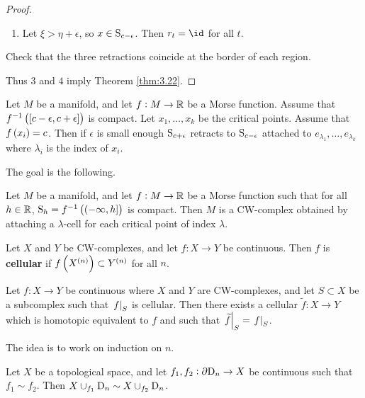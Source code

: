 \begin{proof}
\begin{enumerate}
\begin{enumerate}[label=Case \arabic*., leftmargin=0.5in]
\item Let $ \xi > \eta + \epsilon $, so $ x \in \S_{c - \epsilon} $. Then $ r_t = \id $ for all $ t $.
\end{enumerate}
Check that the three retractions coincide at the border of each region.
\end{enumerate}
Thus $ 3 $ and $ 4 $ imply Theorem \ref{thm:3.22}.
\end{proof}

\begin{remark}
Let $ M $ be a manifold, and let $ f : M \to \RR $ be a Morse function. Assume that $ f^{-1}\br{\sbr{c - \epsilon, c + \epsilon}} $ is compact. Let $ x_1, \dots, x_k $ be the critical points. Assume that $ f\br{x_i} = c $. Then if $ \epsilon $ is small enough $ \S_{c + \epsilon} $ retracts to $ \S_{c - \epsilon} $ attached to $ e_{\lambda_1}, \dots, e_{\lambda_k} $ where $ \lambda_i $ is the index of $ x_i $.
\end{remark}


The goal is the following.

\begin{theorem}
\label{thm:4.12}
Let $ M $ be a manifold, and let $ f : M \to \RR $ be a Morse function such that for all $ h \in \RR $, $ \S_h = f^{-1}\br{\intoc{-\infty, h}} $ is compact. Then $ M $ is a CW-complex obtained by attaching a $ \lambda $-cell for each critical point of index $ \lambda $.
\end{theorem}

\pagebreak

\begin{definition}
Let $ X $ and $ Y $ be CW-complexes, and let $ f : X \to Y $ be continuous. Then $ f $ is \textbf{cellular} if $ f\br{X^{\br{n}}} \subset Y^{\br{n}} $ for all $ n $.
\end{definition}

\begin{theorem}
Let $ f : X \to Y $ be continuous where $ X $ and $ Y $ are CW-complexes, and let $ S \subset X $ be a subcomplex such that $ \eval{f}_S $ is cellular. Then there exists a cellular $ \widetilde{f} : X \to Y $ which is homotopic equivalent to $ f $ and such that $ \eval{\widetilde{f}}_S = \eval{f}_S $.
\end{theorem}

The idea is to work on induction on $ n $.

\begin{theorem}[Whitehead]
Let $ X $ be a topological space, and let $ f_1, f_2 : \da\D_n \to X $ be continuous such that $ f_1 \sim f_2 $. Then $ X \cup_{f_1} \D_n \sim X \cup_{f_2} \D_n $.
\end{theorem}

